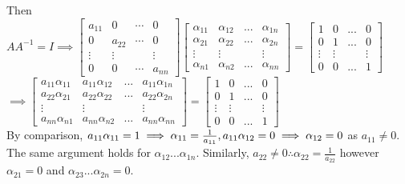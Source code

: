 \documentclass[addpoints]{exam}
\begin{document}
\begin{sloppypar}
\begin{questions}
\begin{solution}
        \vspace{5mm}
        Then $ AA^{-1} = I \implies \begin{bmatrix}
            a_{11} & 0 & \cdots & 0 \\ 
            0 & a_{22} & \cdots & 0 \\
            \vdots & \vdots & & \vdots \\ 
            0 & 0 & \cdots & a_{nn}
        \end{bmatrix}\begin{bmatrix}
            \alpha_{11} & \alpha_{12} & ... & \alpha_{1n} \\ 
            \alpha_{21} & \alpha_{22} & ... & \alpha_{2n} \\ 
            \vdots & \vdots & & \vdots \\ 
            \alpha_{n1} & \alpha_{n2} & ... & \alpha_{nn}
        \end{bmatrix} = \begin{bmatrix}
            1 & 0 & ... & 0 \\ 0 & 1 & ... & 0 \\ \vdots & \vdots & & \vdots \\ 0 & 0 & ... & 1
        \end{bmatrix} $ \\ 
        $ \implies \begin{bmatrix}
            a_{11}\alpha_{11} & a_{11}\alpha_{12} & ... & a_{11}\alpha_{1n} \\ 
            a_{22}\alpha_{21} & a_{22}\alpha_{22} & ... & a_{22}\alpha_{2n} \\ \vdots & \vdots & & \vdots \\ 
            a_{nn}\alpha_{n1} & a_{nn}\alpha_{n2} & ... & a_{nn}\alpha_{nn}
        \end{bmatrix} = \begin{bmatrix}
            1 & 0 & ... & 0 \\ 0 & 1 & ... & 0 \\ \vdots & \vdots & & \vdots \\ 0 & 0 & ... & 1
        \end{bmatrix} $ \\ 
        By comparison, $ a_{11}\alpha_{11} = 1 \implies \alpha_{11} = \frac{1}{a_{11}}, \\ a_{11}\alpha_{12} = 0 \implies \alpha_{12} = 0 $ as $ a_{11} \neq 0 $. The same argument holds for $ \alpha_{12} ... \alpha_{1n}$. Similarly, $ a_{22} \neq 0 \therefore \alpha_{22} = \frac{1}{a_{22}} $ however $ \alpha_{21} = 0 $ and $ \alpha_{23} ... \alpha_{2n} = 0 $. 
        

\end{solution}
\end{questions}
\end{sloppypar}
\end{document}
